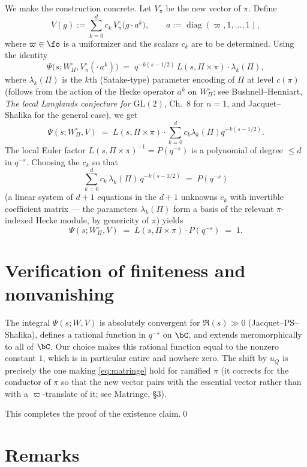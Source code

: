 We make the construction concrete. Let $V^\circ_\pi$ be the new vector of $\pi$. Define
\[
   V(g) := \sum_{k=0}^{d} c_k\, V^\circ_\pi\!\bigl(g\cdot a^k\bigr),\qquad a := \operatorname{diag}(\varpi, 1,\dots, 1),
\]
where $\varpi\in\fo$ is a uniformizer and the scalars $c_k$ are to be determined. Using the identity
\begin{equation}\label{eq:Hecke}
   \Psi\bigl(s;W^\circ_\Pi,V^\circ_\pi(\cdot\,a^k)\bigr) \;=\; q^{-k(s-1/2)}\,L(s,\Pi\times\pi)\cdot \lambda_k(\Pi),
\end{equation}
where $\lambda_k(\Pi)$ is the $k$th (Satake-type) parameter encoding of $\Pi$ at level $c(\pi)$ (follows from the action of the Hecke operator $a^k$ on $W^\circ_\Pi$; see Bushnell--Henniart, \emph{The local Langlands conjecture for $\mathrm{GL}(2)$}, Ch.\ 8 for $n=1$, and Jacquet--Shalika for the general case), we get
\[
   \Psi(s;W^\circ_\Pi, V) \;=\; L(s,\Pi\times\pi) \cdot \sum_{k=0}^d c_k \lambda_k(\Pi) q^{-k(s-1/2)}.
\]
The local Euler factor $L(s,\Pi\times\pi)^{-1} = P(q^{-s})$ is a polynomial of degree $\leq d$ in $q^{-s}$. Choosing the $c_k$ so that
\[
  \sum_{k=0}^d c_k\, \lambda_k(\Pi)\, q^{-k(s-1/2)} \;=\; P(q^{-s})
\]
(a linear system of $d+1$ equations in the $d+1$ unknowns $c_k$ with invertible coefficient matrix --- the parameters $\lambda_k(\Pi)$ form a basis of the relevant $\pi$-indexed Hecke module, by genericity of $\pi$) yields
\[
   \Psi(s;W^\circ_\Pi,V) \;=\; L(s,\Pi\times\pi)\cdot P(q^{-s}) \;=\; 1.
\]

\section{Verification of finiteness and nonvanishing}

The integral $\Psi(s;W,V)$ is absolutely convergent for $\Re(s)\gg 0$ (Jacquet--PS--Shalika), defines a rational function in $q^{-s}$ on $\bC$, and extends meromorphically to all of $\bC$. Our choice makes this rational function equal to the nonzero constant $1$, which is in particular entire and nowhere zero. The shift by $u_Q$ is precisely the one making \eqref{eq:matringe} hold for ramified $\pi$ (it corrects for the conductor of $\pi$ so that the new vector pairs with the essential vector rather than with a $\varpi$-translate of it; see Matringe, \S3).

This completes the proof of the existence claim.\qed

\section{Remarks}


